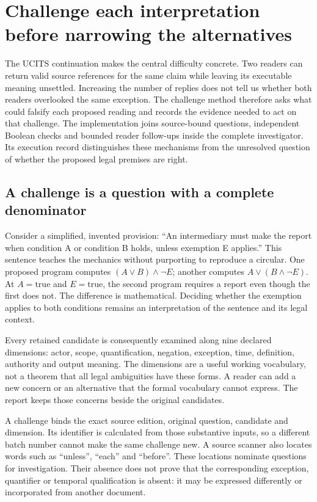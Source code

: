 \section{Challenge each interpretation before narrowing the alternatives}
\label{sec:systematic-challenges}

The UCITS continuation makes the central difficulty concrete. Two readers can
return valid source references for the same claim while leaving its executable
meaning unsettled. Increasing the number of replies does not tell us whether
both readers overlooked the same exception. The challenge method therefore
asks what could falsify each proposed reading and records the evidence needed
to act on that challenge. The implementation joins source-bound questions,
independent Boolean checks and bounded reader follow-ups inside the complete
investigator. Its execution record distinguishes these mechanisms from the
unresolved question of whether the proposed legal premises are right.

\subsection{A challenge is a question with a complete denominator}

Consider a simplified, invented provision: ``An intermediary must make the
report when condition A or condition B holds, unless exemption E applies.''
This sentence teaches the mechanics without purporting to reproduce a circular.
One proposed program computes $(A\lor B)\land\neg E$; another computes
$A\lor(B\land\neg E)$. At $A=\mathrm{true}$ and $E=\mathrm{true}$, the second
program requires a report even though the first does not. The difference is
mathematical. Deciding whether the exemption applies to both conditions remains
an interpretation of the sentence and its legal context.

Every retained candidate is consequently examined along nine declared
dimensions: actor, scope, quantification, negation, exception, time, definition,
authority and output meaning. The dimensions are a useful working vocabulary,
not a theorem that all legal ambiguities have these forms. A reader can add a
new concern or an alternative that the formal vocabulary cannot express. The
report keeps those concerns beside the original candidates.

A challenge binds the exact source edition, original question, candidate and
dimension. Its identifier is calculated from those substantive inputs, so a
different batch number cannot make the same challenge new. A source scanner
also locates words such as ``unless'', ``each'' and ``before''. These locations
nominate questions for investigation. Their absence does not prove that the
corresponding exception, quantifier or temporal qualification is absent: it may
be expressed differently or incorporated from another document.

